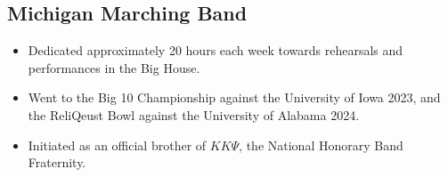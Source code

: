 \documentclass[10pt, letterpaper]{article}
\begin{document}
\subsection*{Michigan Marching Band}
\begin{itemize}[noitemsep]
	\item Dedicated approximately 20 hours each week towards rehearsals and performances in the Big House.
	\item Went to the Big 10 Championship against the University of Iowa 2023,
		and the ReliQeust Bowl against the University of Alabama 2024.
	\item Initiated as an official brother of $K K\Psi$, the National Honorary Band Fraternity.
\end{itemize}
\end{document}

